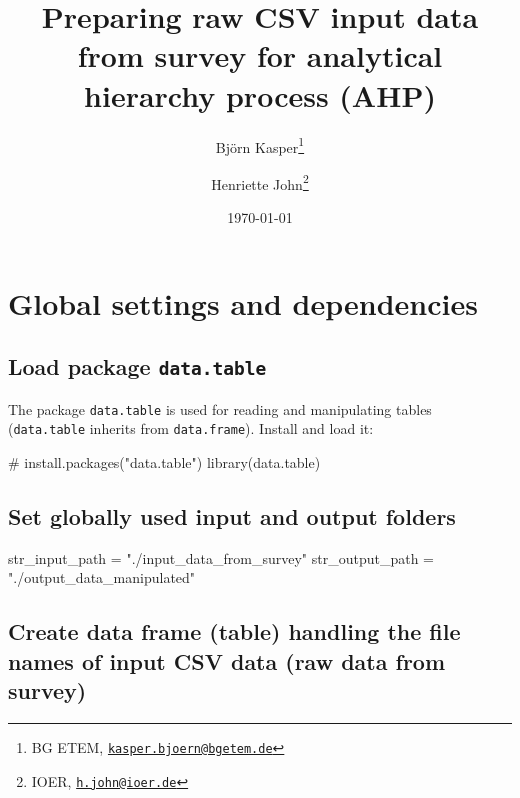 \documentclass[
]{article}
\title{Preparing raw CSV input data from survey for analytical hierarchy
process (AHP)}
\author{Björn Kasper\footnote{BG ETEM,
  \href{mailto:kasper.bjoern@bgetem.de}{\nolinkurl{kasper.bjoern@bgetem.de}}} \and Henriette
John\footnote{IOER,
  \href{mailto:h.john@ioer.de}{\nolinkurl{h.john@ioer.de}}}}
\date{\today}
\newenvironment{Shaded}{\begin{snugshade}}{\end{snugshade}}
\newcommand{\CommentTok}[1]{\textcolor[rgb]{0.54,0.53,0.53}{#1}}
\newcommand{\FunctionTok}[1]{\textcolor[rgb]{0.39,0.29,0.61}{#1}}
\newcommand{\NormalTok}[1]{\textcolor[rgb]{0.12,0.11,0.11}{#1}}
\newcommand{\OtherTok}[1]{\textcolor[rgb]{0.00,0.43,0.16}{#1}}
\newcommand{\StringTok}[1]{\textcolor[rgb]{0.75,0.01,0.01}{#1}}
\begin{document}
\maketitle

{
\setcounter{tocdepth}{2}
\tableofcontents
}
\hypertarget{global-settings-and-dependencies}{%
\section{Global settings and
dependencies}\label{global-settings-and-dependencies}}

\hypertarget{load-package-data.table}{%
\subsection{\texorpdfstring{Load package
\texttt{data.table}}{Load package data.table}}\label{load-package-data.table}}

The package \texttt{data.table} is used for reading and manipulating
tables (\texttt{data.table} inherits from \texttt{data.frame}). Install
and load it:

\begin{Shaded}
\begin{Highlighting}[]
\CommentTok{\# install.packages("data.table")}
\FunctionTok{library}\NormalTok{(data.table)}
\end{Highlighting}
\end{Shaded}

\hypertarget{set-globally-used-input-and-output-folders}{%
\subsection{Set globally used input and output
folders}\label{set-globally-used-input-and-output-folders}}

\begin{Shaded}
\begin{Highlighting}[]
\NormalTok{str\_input\_path }\OtherTok{=} \StringTok{"./input\_data\_from\_survey"}
\NormalTok{str\_output\_path }\OtherTok{=} \StringTok{"./output\_data\_manipulated"}
\end{Highlighting}
\end{Shaded}

\hypertarget{create-data-frame-table-handling-the-file-names-of-input-csv-data-raw-data-from-survey}{%
\subsection{Create data frame (table) handling the file names of input
CSV data (raw data from
survey)}\label{create-data-frame-table-handling-the-file-names-of-input-csv-data-raw-data-from-survey}}
\end{document}
